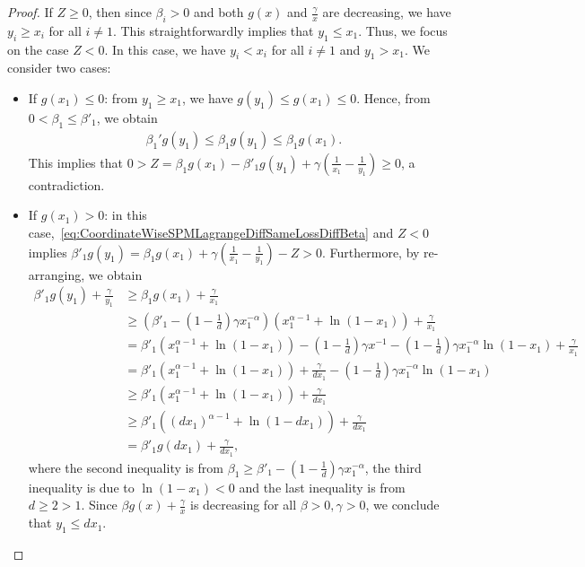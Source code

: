 \begin{proof}
    If $Z \geq 0$, then since $\beta_i > 0$ and both $g(x)$ and $\frac{\gamma}{x}$ are decreasing, we have $y_i \geq x_i$ for all $i \neq 1$. This straightforwardly implies that $y_1 \leq x_1$. Thus, we focus on the case $Z < 0$. In this case, we have $y_i < x_i$ for all $i \neq 1$ and $y_1 > x_1$. We consider two cases:
    \begin{itemize}
        \item If $g(x_1) \leq 0$: from $y_1 \geq x_1$, we have $g(y_1) \leq g(x_1) \leq 0$. Hence, from $0 < \beta_1 \leq \beta'_1$, we obtain
        \begin{align*}
            \beta_1'g(y_1) \leq \beta_1 g(y_1) \leq \beta_1 g(x_1).
        \end{align*}
        This implies that $0 > Z = \beta_1 g(x_1) - \beta'_1 g(y_1) +  \gamma \left(\frac{1}{x_1} - \frac{1}{y_1}\right) \geq 0$, a contradiction. 
        \item If $g(x_1) >0$: in this case,~\eqref{eq:CoordinateWiseSPMLagrangeDiffSameLossDiffBeta} and $Z < 0$ implies $\beta'_1 g(y_1) = \beta_1 g(x_1) + \gamma \left(\frac{1}{x_1} - \frac{1}{y_1}\right) - Z > 0$. Furthermore, by re-arranging, we obtain
        \begin{align*}
            \beta'_1 g(y_1) + \frac{\gamma}{y_1} &\geq \beta_1 g(x_1) + \frac{\gamma}{x_1} \\
            &\geq \left(\beta'_1 - \left(1 - \frac{1}{d}\right)\gamma x_1^{-\alpha}\right)(x_1^{\alpha - 1} + \ln(1-x_1)) + \frac{\gamma}{x_1} \\
            &= \beta'_1(x_1^{\alpha - 1} + \ln(1-x_1)) - \left(1 - \frac{1}{d}\right)\gamma x^{-1} - \left(1 - \frac{1}{d}\right)\gamma x_1^{-\alpha} \ln(1-x_1) + \frac{\gamma}{x_1} \\
            &= \beta'_1(x_1^{\alpha - 1} + \ln(1-x_1)) + \frac{\gamma}{dx_1} - \left(1 - \frac{1}{d}\right)\gamma x_1^{-\alpha} \ln(1-x_1) \\
            &\geq \beta'_1(x_1^{\alpha - 1} + \ln(1-x_1)) + \frac{\gamma}{dx_1} \\
            &\geq \beta'_1((dx_1)^{\alpha - 1} + \ln(1-dx_1)) + \frac{\gamma}{dx_1} \\
            &= \beta'_1 g(dx_1) + \frac{\gamma}{dx_1},
        \end{align*}
        where the second inequality is from $\beta_1 \geq \beta'_1 - \left(1 - \frac{1}{d}\right)\gamma x_1^{-\alpha}$, the third inequality is due to $\ln(1-x_1) < 0$ and the last inequality is from $d \geq 2 > 1$. Since $\beta g(x) + \frac{\gamma}{x}$ is decreasing for all $\beta > 0, \gamma > 0$, we conclude that $y_1 \leq dx_1$.
    \end{itemize}
\end{proof}

